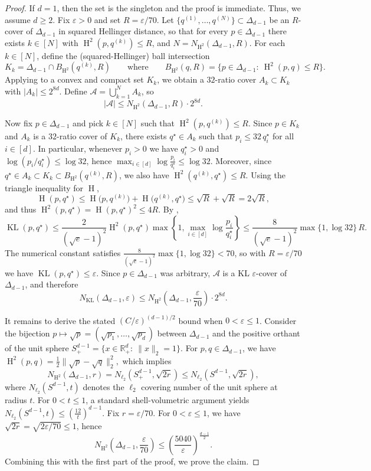 \documentclass[11pt]{article}
\newcommand{\R}{\mathbb R}
\renewcommand{\le}{\leqslant}
\renewcommand{\ge}{\geqslant}
\newcommand{\eps}{\varepsilon}
\renewcommand{\triangleq}{=}
\newcommand{\kl}{\operatorname{KL}}
\newcommand{\kll}[2]{\kl ({#1}, {#2})}
\newcommand{\hel}{\operatorname{H}}
\newcommand{\hels}{\hel^2}
\theoremstyle{definition}
\theoremstyle{remark}
\begin{document}
\begin{proof}
If $d = 1$, then the set is the singleton and the proof is immediate. Thus, we assume $d \ge 2$. Fix $\eps>0$ and set $R\triangleq \eps/70$.
Let $\{q^{(1)},\dots,q^{(N)}\}\subset\Delta_{d-1}$ be an $R$-cover of $\Delta_{d-1}$ in squared Hellinger distance, so that
for every $p\in\Delta_{d-1}$ there exists $k\in[N]$ with $\hels(p,q^{(k)})\le R$, and $N=N_{\hels}(\Delta_{d-1},R)$. For each $k\in[N]$, define the (squared-Hellinger) ball intersection
\[
K_k \triangleq \Delta_{d-1}\cap B_{\hels}(q^{(k)},R)
\qquad\text{where}\qquad
B_{\hels}(q,R)\triangleq\{p\in\Delta_{d-1}:\ \hels(p,q)\le R\}.
\]
Applying  to a convex and compact set $K_k$, we obtain a $32$-ratio cover $A_k\subset K_k$ with $|A_k|\le 2^{8d}$.
Define $\mathcal A\triangleq \bigcup_{k=1}^N A_k$, so
\[
|\mathcal A|\le N_{\hels}(\Delta_{d-1},R)\cdot 2^{8d}.
\]

Now fix $p\in\Delta_{d-1}$ and pick $k\in[N]$ such that $\hels(p,q^{(k)})\le R$.
Since $p\in K_k$ and $A_k$ is a $32$-ratio cover of $K_k$, there exists $q^\star\in A_k$ such that $p_i\le 32\,q^\star_i$ for all $i\in[d]$.
In particular, whenever $p_i>0$ we have $q^\star_i>0$ and $\log(p_i/q^\star_i)\le \log 32$, hence
$
\max_{i\in[d]}\log\frac{p_i}{q^\star_i}\le \log 32.
$
Moreover, since $q^\star\in A_k\subset K_k\subset B_{\hels}(q^{(k)},R)$, we also have $\hels(q^{(k)},q^\star)\le R$.
Using the triangle inequality for $\hel$,
\[
\hel(p,q^\star)\le \hel\bigl(p,q^{(k)}\bigr)+\hel\bigl(q^{(k)},q^\star\bigr)
\le\sqrt{R}+\sqrt{R}=2\sqrt{R},
\]
and thus $\hels(p,q^\star)=\hel(p,q^\star)^2\le 4R$.
By ,
\[
\kll{p}{q^\star}
\le\frac{2}{(\sqrt e-1)^2}\hels(p,q^\star)\max\left\{1,\max_{i\in[d]}\log\frac{p_i}{q^\star_i}\right\}
\le\frac{8}{(\sqrt e-1)^2}\max\{1,\log 32\}\,R.
\]
The numerical constant satisfies $\frac{8}{(\sqrt e-1)^2}\max\{1,\log 32\}<70$, so with $R=\eps/70$ we have $\kll{p}{q^\star}\le \eps$.
Since $p\in\Delta_{d-1}$ was arbitrary, $\mathcal A$ is a KL $\eps$-cover of $\Delta_{d-1}$, and therefore
\[
N_{\kl}(\Delta_{d-1},\eps)\le N_{\hels}\left(\Delta_{d-1},\frac{\eps}{70}\right)\cdot 2^{8d}.
\]

It remains to derive the stated $(C/\eps)^{(d-1)/2}$ bound when $0<\eps\le 1$.
Consider the bijection $p\mapsto \sqrt p\triangleq(\sqrt{p_1},\dots,\sqrt{p_d})$ between $\Delta_{d-1}$ and the positive orthant of the unit sphere
$
{S}^{d-1}_+\triangleq \{x\in\R_+^d:\ \|x\|_2=1\}.
$
For $p,q\in\Delta_{d-1}$, we have
$
\hels(p,q) = \frac12\bigl\|\sqrt p-\sqrt q\bigr\|_2^2,
$ 
which implies
\[
N_{\hels}(\Delta_{d-1},r)= N_{\ell_2}\left({S}^{d-1}_+,\sqrt{2r}\right)
\le N_{\ell_2}\left({S}^{d-1},\sqrt{2r}\right),
\]
where $N_{\ell_2}({S}^{d-1},t)$ denotes the $\ell_2$ covering number of the unit sphere at radius $t$.
For $0<t\le 1$, a standard shell-volumetric argument yields
$
N_{\ell_2}({S}^{d-1},t) \le \left(\frac{12}{t}\right)^{d-1}.
$
Fix $r=\eps/70$. For $0<\eps\le 1$, we have $\sqrt{2r}=\sqrt{2\eps/70}\le 1$, hence
\[
N_{\hels}\left(\Delta_{d-1},\frac{\eps}{70}\right)
\le\left(\frac{5040}{\eps}\right)^{\frac{d-1}{2}}.
\]
Combining this with the first part of the proof, we prove the claim.
\end{proof}
\end{document}
